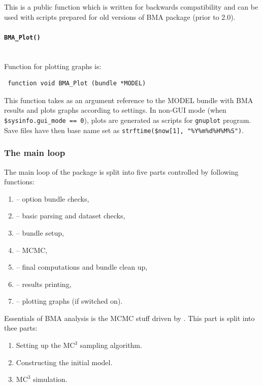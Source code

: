 \noindent This is a public function which is written for
backwards compatibility and can be used with scripts prepared
for old versions of BMA package (prior to 2.0).


\paragraph{\texttt{BMA\_Plot()}}\label{sec:BMA_Plot()}\mbox{}\\

\noindent Function for plotting graphs is: 
\begin{lstlisting}
 function void BMA_Plot (bundle *MODEL)
\end{lstlisting}
This function takes as an argument reference to the MODEL bundle
with BMA results and plots graphs according to  settings.
In non-GUI mode (when \lstinline!$sysinfo!\texttt{\small.gui\_mode == 0}),
plots are generated as scripts for \texttt{gnuplot} program. Save
files have then base name set as \lstinline!strftime($now[1], "%Y%m%d%H%M%S")!.


\subsubsection{The main loop}
The main loop of the  package is split into five parts
controlled by following functions:
\begin{enumerate}
	\item {} -- option bundle checks,
	\item {} -- basic parsing and dataset checks,
	\item {} -- bundle setup,
	\item {} -- MCMC,
	\item {} -- final computations and bundle clean up,
	\item {} -- results printing,
	\item {} -- plotting graphs (if switched on).
\end{enumerate}

Essentials of BMA analysis is the MCMC stuff driven by .
This part is split into thee parts:
\begin{enumerate}
	\item Setting up the $\mbox{MC}^3$ sampling algorithm.
	\item Constructing the initial model.
	\item $\mbox{MC}^3$ simulation.
\end{enumerate}



